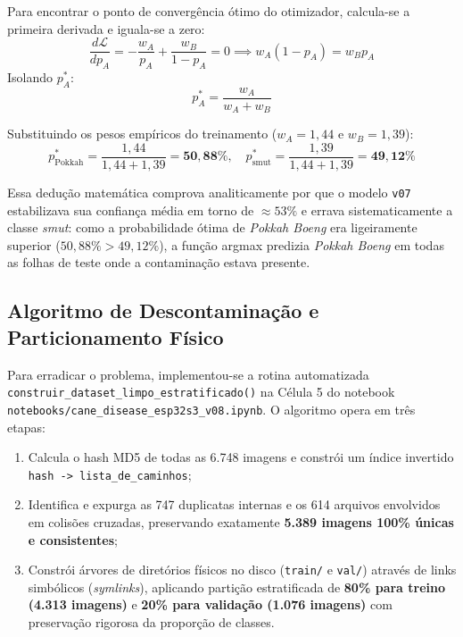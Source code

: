 Para encontrar o ponto de convergência ótimo do otimizador, calcula-se a primeira derivada e iguala-se a zero:
\begin{equation}
\frac{d\mathcal{L}}{dp_A} = -\frac{w_A}{p_A} + \frac{w_B}{1 - p_A} = 0 \implies w_A (1 - p_A) = w_B p_A
\end{equation}
Isolando $p_A^*$:
\begin{equation}
p_A^* = \frac{w_A}{w_A + w_B}
\label{eq:ponto_otimo_conflito}
\end{equation}

Substituindo os pesos empíricos do treinamento ($w_A = 1,44$ e $w_B = 1,39$):
\begin{equation}
p_{\text{Pokkah}}^* = \frac{1,44}{1,44 + 1,39} = \mathbf{50,88\%}, \quad p_{\text{smut}}^* = \frac{1,39}{1,44 + 1,39} = \mathbf{49,12\%}
\end{equation}

Essa dedução matemática comprova analiticamente por que o modelo \texttt{v07} estabilizava sua confiança média em torno de $\approx 53\%$ e errava sistematicamente a classe \textit{smut}: como a probabilidade ótima de \textit{Pokkah Boeng} era ligeiramente superior ($50,88\% > 49,12\%$), a função argmax predizia \textit{Pokkah Boeng} em todas as folhas de teste onde a contaminação estava presente.

\subsection{Algoritmo de Descontaminação e Particionamento Físico}

Para erradicar o problema, implementou-se a rotina automatizada \texttt{construir\_dataset\_limpo\_estratificado()} na Célula 5 do notebook \texttt{notebooks/cane\_disease\_esp32s3\_v08.ipynb}. O algoritmo opera em três etapas:
\begin{enumerate}
    \item Calcula o hash MD5 de todas as 6.748 imagens e constrói um índice invertido \texttt{hash -> lista\_de\_caminhos};
    \item Identifica e expurga as 747 duplicatas internas e os 614 arquivos envolvidos em colisões cruzadas, preservando exatamente \textbf{5.389 imagens 100\% únicas e consistentes};
    \item Constrói árvores de diretórios físicos no disco (\texttt{train/} e \texttt{val/}) através de links simbólicos (\textit{symlinks}), aplicando partição estratificada de \textbf{80\% para treino (4.313 imagens)} e \textbf{20\% para validação (1.076 imagens)} com preservação rigorosa da proporção de classes.
\end{enumerate}

